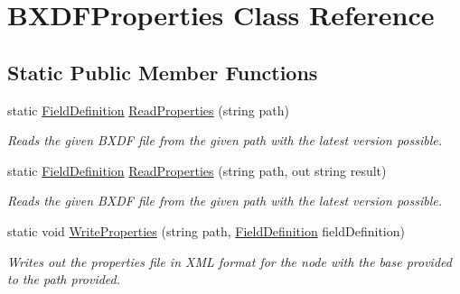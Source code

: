 \hypertarget{class_b_x_d_f_properties}{}\section{B\+X\+D\+F\+Properties Class Reference}
\label{class_b_x_d_f_properties}
\subsection*{Static Public Member Functions}
\begin{DoxyCompactItemize}
\item 
static \hyperlink{class_field_definition}{Field\+Definition} \hyperlink{class_b_x_d_f_properties_aaccec6c74c63d681230c9b08a1e8c4ea}{Read\+Properties} (string path)
\begin{DoxyCompactList}\small\item\em Reads the given B\+X\+DF file from the given path with the latest version possible. \end{DoxyCompactList}\item 
static \hyperlink{class_field_definition}{Field\+Definition} \hyperlink{class_b_x_d_f_properties_a4690668063ed6c1162c495a7c3f9f0b4}{Read\+Properties} (string path, out string result)
\begin{DoxyCompactList}\small\item\em Reads the given B\+X\+DF file from the given path with the latest version possible. \end{DoxyCompactList}\item 
static void \hyperlink{class_b_x_d_f_properties_ad03a0259c98a0a1f59ffec47d7688185}{Write\+Properties} (string path, \hyperlink{class_field_definition}{Field\+Definition} field\+Definition)
\begin{DoxyCompactList}\small\item\em Writes out the properties file in X\+ML format for the node with the base provided to the path provided. \end{DoxyCompactList}\end{DoxyCompactItemize}
